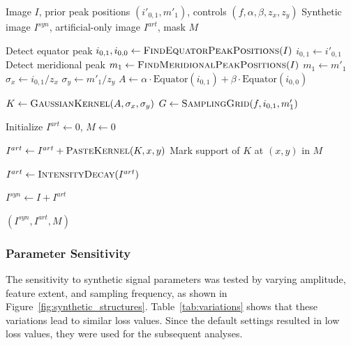 \documentclass[journal,article,submit,moreauthors]{Definitions/mdpi}
\begin{document}
\begin{algorithm}[htbp]
\centering
\begin{minipage}{0.96\columnwidth}
\small
\begin{algorithmic}[1]

\Require Image $I$, prior peak positions $(i'_{0,1}, m'_1)$, controls $(f, \alpha, \beta, z_x, z_y)$
\Ensure Synthetic image $I^{syn}$, artificial-only image $I^{art}$, mask $M$

\State Detect equator peak $i_{0,1}, i_{0,0} \leftarrow \textsc{FindEquatorPeakPositions}(I)$
    \State $i_{0,1} \leftarrow i'_{0,1}$
\EndIf
\State Detect meridional peak $m_1 \leftarrow \textsc{FindMeridionalPeakPositions}(I)$
    \State $m_1 \leftarrow m'_1$
\EndIf
\State $\sigma_x \leftarrow i_{0,1} / z_x$
\State $\sigma_y \leftarrow m'_1 / z_y$
\State $A \leftarrow \alpha \cdot \text{Equator}(i_{0,1}) + \beta \cdot \text{Equator}(i_{0,0})$

\State $K \leftarrow \textsc{GaussianKernel}(A, \sigma_x, \sigma_y)$
\State $G \leftarrow \textsc{SamplingGrid}(f, i_{0,1}, m'_1)$

\State Initialize $I^{art} \leftarrow 0$, $M \leftarrow 0$

    \State $I^{art} \leftarrow I^{art} + \textsc{PasteKernel}(K, x, y)$
    \State Mark support of $K$ at $(x,y)$ in $M$
\EndFor

\State $I^{art} \gets \textsc{IntensityDecay}(I^{art})$

\State $I^{syn} \leftarrow I + I^{art}$

\State \Return $(I^{syn}, I^{art}, M)$

\end{algorithmic}
\end{minipage}
\caption{Procedure for synthetic-feature generation and mask construction used for validation in the absence of ground-truth background.}
\label{alg:synthetic_signal}
\end{algorithm}

\subsubsection{Parameter Sensitivity}
The sensitivity to synthetic signal parameters was tested by varying amplitude, feature extent, and sampling frequency, as shown in Figure~\ref{fig:synthetic_structures}. Table~\ref{tab:variations} shows that these variations lead to similar loss values. Since the default settings resulted in low loss values, they were used for the subsequent analyses.
\end{document}
